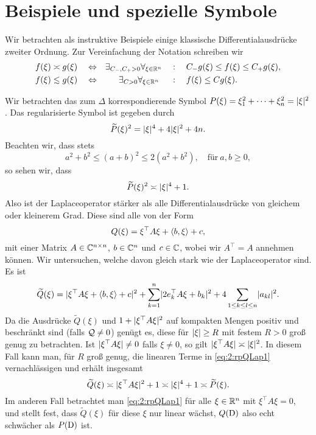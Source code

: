 \section{Beispiele und spezielle Symbole}

Wir betrachten als instruktive Beispiele
einige klassische Differentialausdrücke zweiter Ordnung.
Zur Vereinfachung der Notation schreiben wir
\begin{align}
f(\xi)\asymp g(\xi)\quad&\gdw&
\exists_{C_-,C_+>0}\forall_{\xi\in\R^n}\quad&:\quad C_-g(\xi)\leq f(\xi)\leq C_+g(\xi),\\
f(\xi)\apprle g(\xi)\quad&\gdw&
\exists_{C>0}\forall_{\xi\in\R^n}~\quad&:\quad f(\xi)\leq Cg(\xi).
\end{align}

\begin{exa}\label{exa:2:lap}
Wir betrachten das zum  $\Delta$
korrespondierende Symbol $P(\xi)=\xi_1^2+\dots+\xi_n^2=\lvert\xi\rvert^2$.
Das regularisierte Symbol ist gegeben durch
\begin{equation}
\widetilde{P}(\xi)^2=\lvert\xi\rvert^4+4\lvert\xi\rvert^2+4n.
\end{equation}
Beachten wir, dass stets
\begin{equation}\label{eq:2:sqrest}
a^2+b^2\leq(a+b)^2\leq2(a^2+b^2),\quad\text{für}~a,b\geq0,
\end{equation}
so sehen wir, dass
\begin{equation}
\widetilde{P}(\xi)^2\asymp\lvert\xi\rvert^4+1.
\end{equation}
Also ist der Laplaceoperator stärker als alle Differentialausdrücke von gleichem oder kleinerem Grad.
Diese sind alle von der Form
\begin{equation}
Q(\xi)=\xi^\top A\xi+\langle b,\xi\rangle+c,
\end{equation}
mit einer Matrix $A\in\mathbb C^{n\times n}$, $b\in\mathbb C^n$ und $c\in\mathbb C$,
wobei wir $A^\top=A$ annehmen können.
Wir untersuchen, welche davon gleich stark wie der Laplaceoperator sind.
Es ist
\begin{equation}\label{eq:2:rpQLap1}
\widetilde{Q}(\xi)=\lvert\xi^\top A\xi+\langle b,\xi\rangle+c\rvert^2+\sum_{k=1}^n\lvert2e^\top_kA\xi+b_k\rvert^2
+4\sum_{1\leq k\leq l\leq n}\lvert a_{kl}\rvert^2.
\end{equation}
Da die Ausdrücke $\widetilde{Q}(\xi)$ und $1+\lvert\xi^\top A\xi\rvert^2$
auf kompakten Mengen positiv und beschränkt sind (falls $\mathcal Q\neq0$) genügt es,
diese für $\lvert\xi\rvert\geq R$ mit festem $R>0$ groß genug zu betrachten.
Ist $\lvert\xi^\top A\xi\rvert\neq0$ falls $\xi\neq0$,
so gilt $\lvert\xi^\top A\xi\rvert\asymp\lvert\xi\rvert^2$.
In diesem Fall kann man, für $R$ groß genug,
die linearen Terme in \eqref{eq:2:rpQLap1} vernachlässigen
und erhält insgesamt
\begin{equation}
\widetilde{Q}(\xi)\asymp\lvert\xi^\top A\xi\rvert^2+1\asymp\lvert\xi\rvert^4+1\asymp\widetilde{P}(\xi).
\end{equation}
Im anderen Fall betrachtet man \eqref{eq:2:rpQLap1}
für alle $\xi\in\mathbb R^n$ mit $\xi^\top A\xi=0$,
und stellt fest, dass $\widetilde{Q}(\xi)$ für diese $\xi$ nur linear wächst,
$Q(\mathrm D)$ also echt schwächer als $P(\mathrm D)$ ist.


\end{exa}

